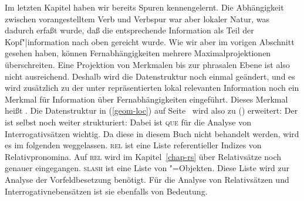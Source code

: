 Im letzten Kapitel haben wir bereits Spuren kennengelernt. Die Abhängigkeit zwischen vorangestelltem
Verb und Verbspur war aber lokaler Natur, was dadurch erfaßt wurde, daß die entsprechende Information
als Teil der Kopf"|information nach oben gereicht wurde. Wie wir aber im vorigen Abschnitt gesehen haben,
können Fernabhängigkeiten mehrere Maximalprojektionen überschreiten. Eine Projektion von Merkmalen
bis zur phrasalen Ebene ist also nicht ausreichend. Deshalb wird die Datenstruktur noch einmal geändert,
und es wird zusätzlich zu der unter \local repräsentierten lokal relevanten Information noch ein
Merkmal für Information über Fernabhängigkeiten eingeführt. Dieses Merkmal heißt \nonloc.
Die Datenstruktur in (\ref{geom-loc}) auf Seite~\pageref{geom-loc} wird also zu () erweitert:
\ea
\label{geom-nonloc}
\z
Der \nonlocw ist selbst noch weiter strukturiert:
\ea
{}
\z
Dabei ist \textsc{que} für die Analyse von Interrogativsätzen wichtig. Da diese in diesem Buch nicht behandelt
werden, wird es im folgenden weggelassen. \textsc{rel} ist eine Liste referentieller Indizes von Relativpronomina. Auf
\textsc{rel} wird im Kapitel~\ref{chap-rs} über Relativsätze noch genauer eingegangen.
\textsc{slash} ist eine Liste von "=Objekten. Diese Liste wird zur Analyse
der Vorfeldbesetzung benötigt. Für die Analyse von Relativsätzen und Interrogativnebensätzen
ist sie ebenfalls von Bedeutung.


